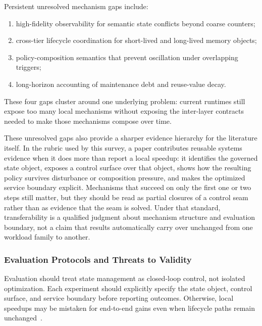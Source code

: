 \documentclass[acmsmall,screen,review]{acmart}
\begin{document}
Persistent unresolved mechanism gaps include:
\begin{enumerate}[leftmargin=*]
\item high-fidelity observability for semantic state conflicts beyond coarse counters;
\item cross-tier lifecycle coordination for short-lived and long-lived memory objects;
\item policy-composition semantics that prevent oscillation under overlapping triggers;
\item long-horizon accounting of maintenance debt and reuse-value decay.
\end{enumerate}

These four gaps cluster around one underlying problem: current runtimes still expose too many local mechanisms without exposing the inter-layer contracts needed to make those mechanisms compose over time.

These unresolved gaps also provide a sharper evidence hierarchy for the literature itself. In the rubric used by this survey, a paper contributes reusable systems evidence when it does more than report a local speedup: it identifies the governed state object, exposes a control surface over that object, shows how the resulting policy survives disturbance or composition pressure, and makes the optimized service boundary explicit. Mechanisms that succeed on only the first one or two steps still matter, but they should be read as partial closures of a control seam rather than as evidence that the seam is solved. Under that standard, transferability is a qualified judgment about mechanism structure and evaluation boundary, not a claim that results automatically carry over unchanged from one workload family to another.

\subsubsection{Evaluation Protocols and Threats to Validity}

Evaluation should treat state management as closed-loop control, not isolated optimization. Each experiment should explicitly specify the state object, control surface, and service boundary before reporting outcomes. Otherwise, local speedups may be mistaken for end-to-end gains even when lifecycle paths remain unchanged~\cite{kwon2023pagedattention,agrawal2024sarathi,zheng2023sglang,mao2023morphstream}.
\end{document}
